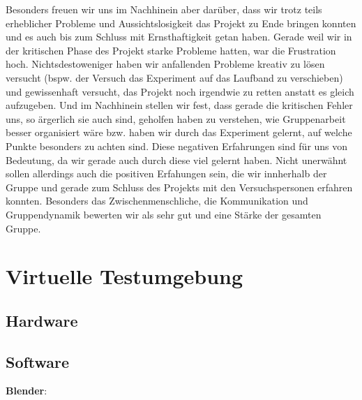 \documentclass{Bericht}
\begin{document}
Besonders freuen wir uns im Nachhinein aber darüber, dass wir trotz teils erheblicher Probleme und Aussichtslosigkeit das Projekt zu Ende bringen konnten und es auch bis zum Schluss mit Ernsthaftigkeit getan haben. Gerade weil wir in der kritischen Phase des Projekt starke Probleme hatten, war die Frustration hoch. Nichtsdestoweniger haben wir anfallenden Probleme kreativ zu lösen versucht (bspw. der Versuch das Experiment auf das Laufband zu verschieben) und gewissenhaft versucht, das Projekt noch irgendwie zu retten anstatt es gleich aufzugeben. Und im Nachhinein stellen wir fest, dass gerade die kritischen Fehler uns, so ärgerlich sie auch sind, geholfen haben zu verstehen, wie Gruppenarbeit besser organisiert wäre bzw. haben wir durch das Experiment gelernt, auf welche Punkte besonders zu achten sind. Diese negativen Erfahrungen sind für uns von Bedeutung, da wir gerade auch durch diese viel gelernt haben.
Nicht unerwähnt sollen allerdings auch die positiven Erfahungen sein, die wir innherhalb der Gruppe und gerade zum Schluss des Projekts mit den Versuchspersonen erfahren konnten. Besonders das Zwischenmenschliche, die Kommunikation und Gruppendynamik bewerten wir als sehr gut und eine Stärke der gesamten Gruppe. 


































\section{Virtuelle Testumgebung}

\subsection{Hardware}
\subsection{Software}
\textbf{Blender}:\\
\end{document}

